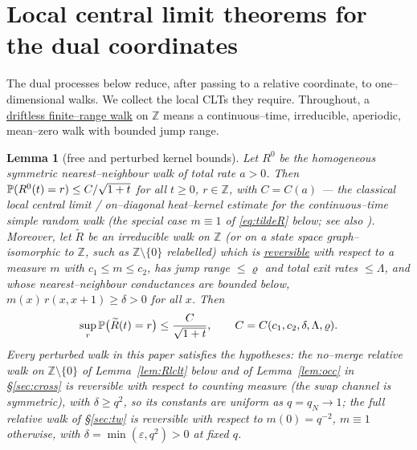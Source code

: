 \documentclass[11pt]{article}
\theoremstyle{plain}
\newtheorem{lemma}[theorem]{Lemma}
\theoremstyle{definition}
\theoremstyle{remark}
\newcommand{\Z}{\mathbb{Z}}\newcommand{\R}{\mathbb{R}}\newcommand{\N}{\mathbb{N}}
\newcommand{\eps}{\varepsilon}\newcommand{\Exp}{\mathrm{Exp}}
\begin{document}
\section{Local central limit theorems for the dual coordinates}\label{sec:lclt}

The dual processes below reduce, after passing to a relative coordinate, to
one--dimensional walks. We collect the local CLTs they require. Throughout, a
\underline{driftless finite--range walk} on $\Z$ means a continuous--time, irreducible,
aperiodic, mean--zero walk with bounded jump range.

\begin{lemma}[free and perturbed kernel bounds]\label{lem:free}
Let $R^0$ be the homogeneous symmetric nearest--neighbour walk of total rate $a>0$.
Then $\mathbb{P}(R^0(t)=r)\le C/\sqrt{1+t}$ for all $t\ge0$, $r\in\Z$, with $C=C(a)$ --- the
classical local central limit / on--diagonal heat--kernel estimate for the
continuous--time simple random walk (the special case $m\equiv1$ of \eqref{eq:tildeR}
below; see also \cite{LawlerLimic}).
Moreover, let $\widetilde R$ be an irreducible walk on $\Z$ (or on a state space
graph--isomorphic to $\Z$, such as $\Z\setminus\{0\}$ relabelled) which is
\underline{reversible} with respect to a measure $m$ with $c_1\le m\le c_2$, has jump range
$\le\varrho$ and total exit rates $\le\Lambda$, and whose nearest--neighbour
conductances are bounded below, $m(x)\,r(x,x+1)\ge\delta>0$ for all $x$. Then
\begin{equation}\label{eq:tildeR}
  \sup_{r}\mathbb{P}\big(\widetilde R(t)=r\big)\le \frac{C}{\sqrt{1+t}},
  \qquad C=C(c_1,c_2,\delta,\Lambda,\varrho).
\end{equation}
Every perturbed walk in this paper satisfies the hypotheses: the no--merge relative
walk on $\Z\setminus\{0\}$ of Lemma~\ref{lem:Rlclt} below and of Lemma~\ref{lem:occ} in \S\ref{sec:cross} is reversible
with respect to counting measure (the swap channel is symmetric), with $\delta\ge
q^2$, so its constants are uniform as $q=q_N\to1$; the full relative walk of
\S\ref{sec:tw} is reversible with respect to $m(0)=q^{-2}$, $m\equiv1$ otherwise, with
$\delta=\min(\eps,q^2)>0$ at fixed $q$.
\end{lemma}
\end{document}
